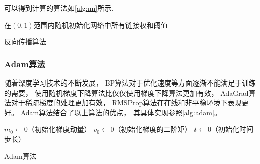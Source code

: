 可以得到计算的算法如\cref{alg:nn}所示\cite{zhouzhihuaJiQiXueXi}.

\begin{algorithm}
    在$(0, 1)$范围内随机初始化网络中所有链接权和阈值\;
    \caption{反向传播算法}\label{alg:nn}
\end{algorithm}

\subsubsection{Adam算法}

随着深度学习技术的不断发展，
BP算法对于优化速度等方面逐渐不能满足于训练的需要，
使用随机梯度下降算法比仅仅使用梯度下降算法更加有效，
AdaGrad算法对于稀疏梯度的处理更加有效\cite{duchiAdaptiveSubgradientMethods2011}，
RMSProp算法在在线和非平稳环境下表现更好\cite{tielemanLecture5rmspropDivide2012}。
Adam算法结合了以上算法的优点，
其具体实现参照\cref{alg:adam}\cite{kingmaAdamMethodStochastic2017}。

\begin{algorithm}
    \KwData{$\beta_1,\beta_2\in [0,1)$：非负加权参数} %
    $m_0\leftarrow0$（初始化梯度动量）\;
    $v_0\leftarrow0$（初始化梯度的二阶矩）\;
    $t\leftarrow0$（初始化时间步长）\;
    \caption{Adam算法}\label{alg:adam}
\end{algorithm}

